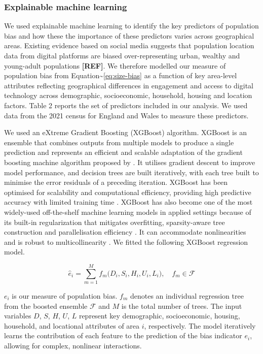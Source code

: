 \documentclass[]{rsos}%
\begin{document}
\subsubsection{Explainable machine learning}\label{explainable-machine-learning}

We used explainable machine learning to identify the key predictors of
population bias and how these the importance of these predictors varies
across geographical areas. Existing evidence based on social media
suggests that population location data from digital platforms are biased
over-representing urban, wealthy and young-adult populations \textbf{{[}REF{]}}.
We therefore modelled our measure of population bias from
Equation\textasciitilde{}\ref{eq:size-bias} as a function of key area-level attributes
reflecting geographical differences in engagement and access to digital
technology across demographic, socioeconomic, household, housing and
location factors. Table 2 reports the set of predictors included in our
analysis. We used data from the 2021 census for England and Wales to
measure these predictors.

We used an eXtreme Gradient Boosting (XGBoost) algorithm. XGBoost is an
ensemble that combines outputs from multiple models to produce a single
prediction and represents an efficient and scalable adaptation of the
gradient boosting machine algorithm proposed by \citep{friedman2001a}. It
utilises gradient descent to improve model performance, and decision
trees are built iteratively, with each tree built to minimise the error
residuals of a preceding iteration. XGBoost has been optimised for
scalability and computational efficiency, providing high predictive
accuracy with limited training time \citep{chen2016, nielsen2016tree}.
XGBoost has also become one of the most widely-used off-the-shelf
machine learning models in applied settings because of its built-in
regularization that mitigates overfitting, sparsity-aware tree
construction and parallelisation efficiency \citep{chen2016}. It can
accommodate nonlinearities and is robust to multicollinearity
\citep{chen2016}. We fitted the following XGBoost regression model.

\begin{equation} \label{eq:xgb-model}
\widehat{e}_i 
= \sum_{m=1}^M f_m\bigl(D_i, S_i, H_i, U_i, L_i\bigr),
\quad f_m \in \mathcal{F}
\end{equation}

\(e_i\) is our measure of population bias. \(f_m\) denotes an individual
regression tree from the boosted ensemble \(\mathcal{F}\) and \(M\) is the
total number of trees. The input variables \(D\), \(S\), \(H\), \(U\), \(L\)
represent key demographic, socioeconomic, housing, household, and
locational attributes of area \(i\), respectively. The model iteratively
learns the contribution of each feature to the prediction of the bias
indicator \(e_i\), allowing for complex, nonlinear interactions.
\end{document}
